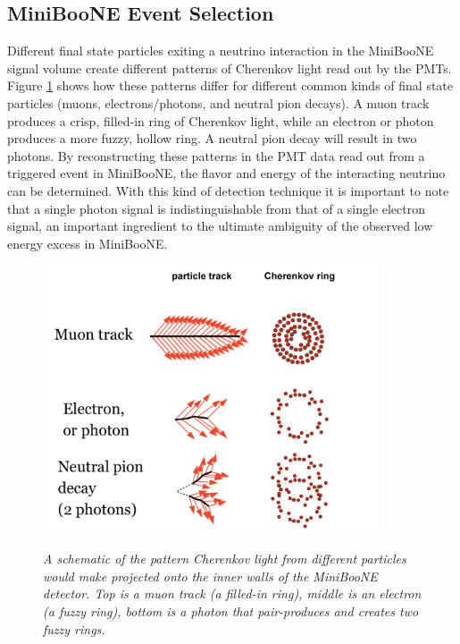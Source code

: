 \subsection{MiniBooNE Event Selection}

Different final state particles exiting a neutrino interaction in the MiniBooNE signal volume create different patterns of Cherenkov light read out by the PMTs. Figure \ref{georgia_cherenkov_cartoon_fig} \cite{GeorgiaThesis} shows how these patterns differ for different common kinds of final state particles (muons, electrons/photons, and neutral pion decays). A muon track produces a crisp, filled-in ring of Cherenkov light, while an electron or photon produces a more fuzzy, hollow ring. A neutral pion decay will result in two photons. By reconstructing these patterns in the PMT data read out from a triggered event in MiniBooNE, the flavor and energy of the interacting neutrino can be determined. With this kind of detection technique it is important to note that a single photon signal is indistinguishable from that of a single electron signal, an important ingredient to the ultimate ambiguity of the observed low energy excess in MiniBooNE.\\

\begin{figure}[ht!]
\centering
	\includegraphics[width=0.9\textwidth]{Figures/georgia_cherenkov_cartoon.png} \\
\caption{\textit{A schematic of the pattern Cherenkov light from different particles would make projected onto the inner walls of the MiniBooNE detector. Top is a muon track (a filled-in ring), middle is an electron (a fuzzy ring), bottom is a photon that pair-produces and creates two fuzzy rings.}}\label{georgia_cherenkov_cartoon_fig}
\end{figure}

